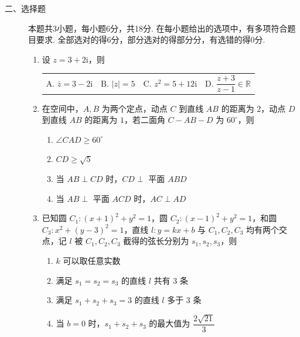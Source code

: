 \begin{description}
    \item[二、选择题] 本题共3小题，每小题6分，共18分. 在每小题给出的选项中，有多项符合题目要求. 全部选对的得6分，部分选对的得部分分，有选错的得0分. 
    \begin{enumerate}[leftmargin=5pt]
      \addtocounter{enumi}{+8}   
        \item 设 $z=3+2\mathrm{i}$，则

        {\centering\begin{tabular*}{\linewidth}{@{}@{\extracolsep{\fill}}llll@{}}
          \(\text{A. }\bar{z}=3-2\mathrm{i}\)  & \(\text{B. }|z|=5\) &\(\text{C. }z^2=5+12\mathrm{i}\)  & \(\text{D. }\dfrac{z+3}{z-1}\in\mathbb{R}\)
        \end{tabular*}\par}

        \item 在空间中，$A,B$ 为两个定点，动点 $C$ 到直线 $AB$ 的距离为 $2$，动点 $D$ 到直线 $AB$ 的距离为 $1$，若二面角 $C-AB-D$ 为 $60^\circ$，则
        \begin{enumerate}[label=\Alph*.]
            \item $\angle CAD\geqslant 60^\circ$
            \item $CD\geqslant\sqrt{5}$
            \item 当 $AB\perp CD$ 时，$CD\perp$ 平面 $ABD$
            \item 当 $AB\perp$ 平面 $ACD$ 时，$AC\perp AD$
    \end{enumerate}

        \item 已知圆 $C_1:(x+1)^2+y^2=1$，圆 $C_2:(x-1)^2+y^2=1$，和圆 $C_3:x^2+(y-3)^2=1$，直线 $l:y=kx+b$ 与 $C_1,C_2,C_3$ 均有两个交点，记 $l$ 被 $C_1,C_2,C_3$ 截得的弦长分别为 $s_1,s_2,s_3$，则
        \begin{enumerate}[label=\Alph*.]
            \item $k$ 可以取任意实数
            \item 满足 $s_1=s_2=s_3$ 的直线 $l$ 共有 $3$ 条
            \item 满足 $s_1+s_2+s_3=3$ 的直线 $l$ 多于 $3$ 条
            \item 当 $b=0$ 时，$s_1+s_2+s_3$ 的最大值为 $\dfrac{2\sqrt{21}}{3}$
    \end{enumerate}
    \end{enumerate}
\end{description}

